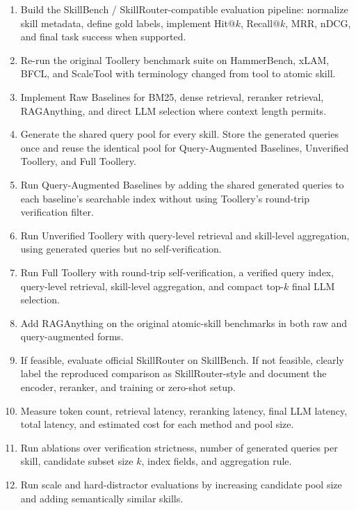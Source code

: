 \begin{enumerate}
    \item Build the SkillBench / SkillRouter-compatible evaluation pipeline:
    normalize skill metadata, define gold labels, implement Hit@$k$,
    Recall@$k$, MRR, nDCG, and final task success when supported.
    \item Re-run the original Toollery benchmark suite on HammerBench, xLAM,
    BFCL, and ScaleTool with terminology changed from tool to atomic skill.
    \item Implement Raw Baselines for BM25, dense retrieval, reranker retrieval,
    RAGAnything, and direct LLM selection where context length permits.
    \item Generate the shared query pool for every skill. Store the generated
    queries once and reuse the identical pool for Query-Augmented Baselines,
    Unverified Toollery, and Full Toollery.
    \item Run Query-Augmented Baselines by adding the shared generated queries to
    each baseline's searchable index without using Toollery's round-trip
    verification filter.
    \item Run Unverified Toollery with query-level retrieval and skill-level
    aggregation, using generated queries but no self-verification.
    \item Run Full Toollery with round-trip self-verification, a verified query
    index, query-level retrieval, skill-level aggregation, and compact top-$k$
    final LLM selection.
    \item Add RAGAnything on the original atomic-skill benchmarks in both raw and
    query-augmented forms.
    \item If feasible, evaluate official SkillRouter on SkillBench. If not
    feasible, clearly label the reproduced comparison as SkillRouter-style and
    document the encoder, reranker, and training or zero-shot setup.
    \item Measure token count, retrieval latency, reranking latency, final LLM
    latency, total latency, and estimated cost for each method and pool size.
    \item Run ablations over verification strictness, number of generated
    queries per skill, candidate subset size $k$, index fields, and aggregation
    rule.
    \item Run scale and hard-distractor evaluations by increasing candidate pool
    size and adding semantically similar skills.
\end{enumerate}

